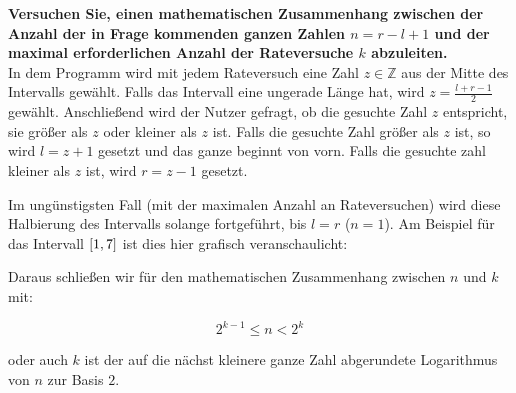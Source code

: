 \documentclass{article}
\begin{document}
\newpage

\textbf{Versuchen Sie, einen mathematischen Zusammenhang zwischen der Anzahl der in Frage kommenden ganzen Zahlen
$n = r - l + 1$ und der maximal erforderlichen Anzahl der Rateversuche $k$ abzuleiten.} \\

In dem Programm wird mit jedem Rateversuch eine Zahl $z \in \mathbb{Z}$ aus der Mitte des Intervalls gewählt.
Falls das Intervall eine ungerade Länge hat, wird $z = \frac{l + r - 1}{2}$ gewählt.
Anschließend wird der Nutzer gefragt, ob die gesuchte Zahl $z$ entspricht, sie größer als $z$ oder kleiner
als $z$ ist.
Falls die gesuchte Zahl größer als $z$ ist, so wird $l = z + 1$ gesetzt und das ganze beginnt von vorn.
Falls die gesuchte zahl kleiner als $z$ ist, wird $r = z - 1$ gesetzt.

Im ungünstigsten Fall (mit der maximalen Anzahl an Rateversuchen) wird diese Halbierung des Intervalls
solange fortgeführt, bis $l = r$ ($n = 1$).
Am Beispiel für das Intervall $\interval{1}{7}$ ist dies hier grafisch veranschaulicht:


Daraus schließen wir für den mathematischen Zusammenhang zwischen $n$ und $k$ mit:

\[
  2^{k - 1} \leq n < 2^k
\]

oder auch $k$ ist der auf die nächst kleinere ganze Zahl abgerundete Logarithmus von $n$ zur Basis $2$.
\end{document}
